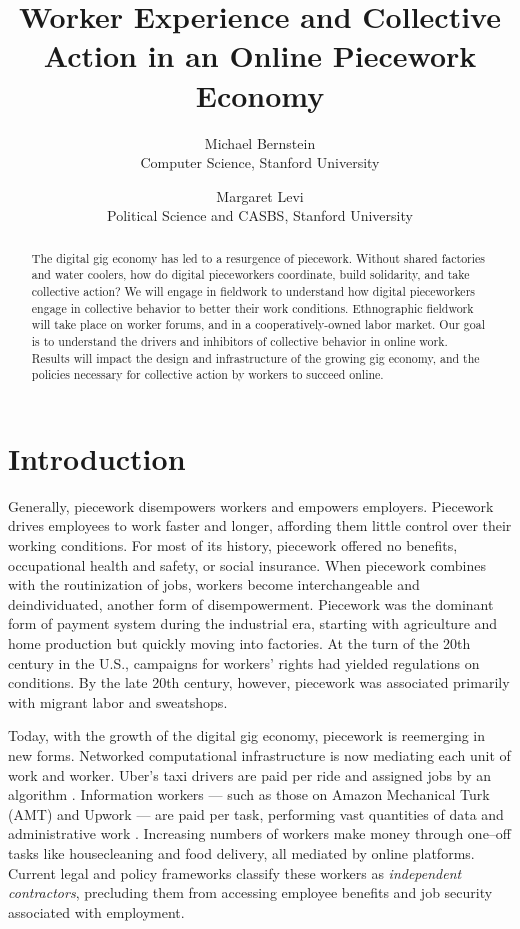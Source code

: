 \documentclass[11pt]{article}
\title{Worker Experience and Collective Action in an Online Piecework Economy}
\author{
Michael Bernstein\\
Computer Science, Stanford University
\and
Margaret Levi\\
Political Science and CASBS, Stanford University
}
\begin{document}
\begin{titlingpage}
  \maketitle
\end{titlingpage}

\pagebreak
\begin{abstract}
The digital gig economy has led to a resurgence of piecework.
Without shared factories and water coolers,
how do digital pieceworkers coordinate,
build solidarity,
and take collective action?
We will engage in fieldwork to understand
how digital pieceworkers engage in collective behavior
to better their work conditions.
Ethnographic fieldwork will take place on worker forums,
and in a cooperatively-owned labor market.
Our goal is to understand the drivers and inhibitors of collective behavior in online work.
Results will impact the design and infrastructure of the growing gig economy,
and the policies necessary for collective action by workers to succeed online.
\end{abstract}



\section{Introduction}
Generally, piecework disempowers workers and empowers employers.
Piecework drives employees to work faster and longer,
affording them little control over their working conditions.
For most of its history, piecework offered no
  benefits,
  occupational health and safety,
  or social insurance.
When piecework combines with the routinization of jobs,
workers become interchangeable and deindividuated,
another form of disempowerment.
Piecework was the dominant form of payment system during the industrial era,
starting with agriculture and home production but quickly moving into factories.
At the turn of the 20th century in the U.S.,
campaigns for workers' rights had yielded regulations on conditions.
By the late 20th century, however, piecework was associated primarily with migrant labor and sweatshops.

Today, with the growth of the digital gig economy, piecework is reemerging in new forms.
Networked computational infrastructure is now mediating each unit of work and worker.
Uber's taxi drivers are paid per ride and assigned jobs by an algorithm
\citep{uberAlgorithm,hall2015analysis}.
Information workers
--- such as those on Amazon Mechanical Turk (AMT) and Upwork ---
are paid per task, performing vast quantities of data and administrative work
\citep{martin2014being}.
Increasing numbers of workers make money through one--off tasks like
  housecleaning
  and food delivery,
all mediated by online platforms.
Current legal and policy frameworks classify these workers as
\textit{independent contractors},
precluding them from accessing employee benefits and job security associated with employment.
\end{document}
